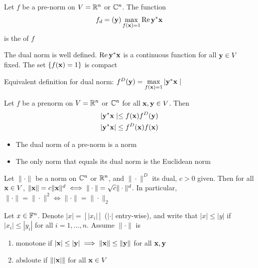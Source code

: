 \documentclass[aspectratio=169]{beamer}
\begin{document}
\begin{frame}
\begin{definition}
Let $f$ be a pre-norm on $V=\mathbb{R}^n$ or $\mathbb{C}^n$. The function 
\[f_d=(\mathbf{y}) \max\limits_{f(\mathbf{x})=1} \operatorname{Re} \mathbf{y}^* \mathbf{x}\]
is the  of $f$
\end{definition}
\vfill
\begin{remark}
The dual norm is well defined. $\operatorname{Re}\mathbf{y}^*\mathbf{x}$ is a continuous function for all $\mathbf{y}\in V$ fixed. The set $\{f(\mathbf{x})=1\}$ is compact 
\end{remark}
\vfill
Equivalent definition for dual norm: $f^D(\mathbf{y})= \max\limits_{f(\mathbf{x})=1} | \mathbf{y}^*\mathbf{x}\mid$
\end{frame}


\begin{frame}
\begin{lemma}
Let $f$ be a prenorm on $V=\mathbb{R}^n$ or $\mathbb{C}^n$ for all $\mathbf{x},\mathbf{y}\in V$. Then 
\begin{align*}
    & |\mathbf{y}^*\mathbf{x}\mid \leq f(\mathbf{x})f^D(\mathbf{y})\\
    & | \mathbf{y}^*\mathbf{x} | \leq f^D(\mathbf{x})f(\mathbf{x})
\end{align*}
\end{lemma}
\vfill
\begin{remark}
\begin{itemize}
    \item The dual norm of a pre-norm is a norm
    \item The only norm that equals its dual norm is the Euclidean norm 
\end{itemize}
\end{remark}
\end{frame}



\begin{frame}
\begin{theorem}
Let $\|\cdot\|$ be a norm on $\mathbb{C}^n$ or $\mathbb{R}^n$, and $\|\cdot\|^D$ its dual, $c>0$ given. Then for all $\mathbf{x}\in V$, $\|\mathbf{x}\|= c\|\mathbf{x}\|^d \iff \|\cdot\|= \sqrt{c}\|\cdot\|^d$.
In particular, $\|\cdot\|= \|\cdot\|^2 \iff \|\cdot\|= \|\cdot\|_2$
\end{theorem}
\vfill
\begin{definition}
Let $x\in \mathbb{F}^n$. Denote $| x|= [|x_i|]$ ($|\cdot |$ entry-wise), and write that $|x|\leq |y |$ if $|x_i|\leq |y_i|$ for all $i= 1, \dots, n$. Assume $\|\cdot\|$ is 
\begin{enumerate}
    \item monotone if $|\mathbf{x}|\leq |\mathbf{y}| \implies \|\mathbf{x}\| \leq \|\mathbf{y}\|$ for all $\mathbf{x},\mathbf{y}$
    \item absloute if $\left \| |\mathbf{x}| \right\| $ for all $\mathbf{x}\in V$
\end{enumerate}
\end{definition}
\end{frame}
\end{document}
